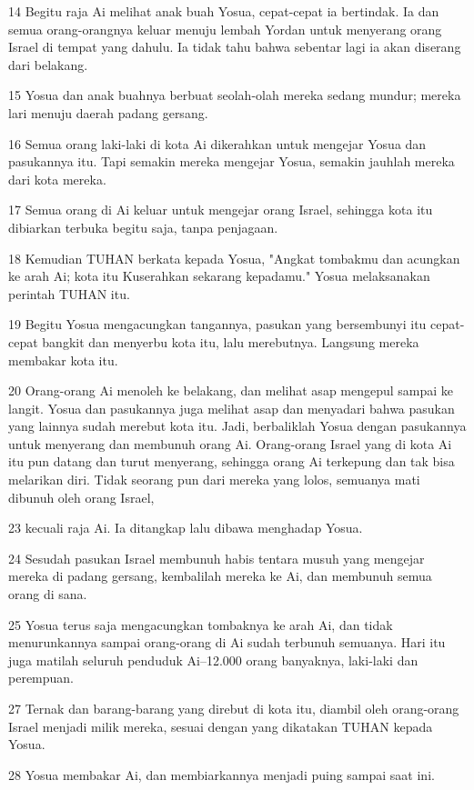 \par 14 Begitu raja Ai melihat anak buah Yosua, cepat-cepat ia bertindak. Ia dan semua orang-orangnya keluar menuju lembah Yordan untuk menyerang orang Israel di tempat yang dahulu. Ia tidak tahu bahwa sebentar lagi ia akan diserang dari belakang.
\par 15 Yosua dan anak buahnya berbuat seolah-olah mereka sedang mundur; mereka lari menuju daerah padang gersang.
\par 16 Semua orang laki-laki di kota Ai dikerahkan untuk mengejar Yosua dan pasukannya itu. Tapi semakin mereka mengejar Yosua, semakin jauhlah mereka dari kota mereka.
\par 17 Semua orang di Ai keluar untuk mengejar orang Israel, sehingga kota itu dibiarkan terbuka begitu saja, tanpa penjagaan.
\par 18 Kemudian TUHAN berkata kepada Yosua, "Angkat tombakmu dan acungkan ke arah Ai; kota itu Kuserahkan sekarang kepadamu." Yosua melaksanakan perintah TUHAN itu.
\par 19 Begitu Yosua mengacungkan tangannya, pasukan yang bersembunyi itu cepat-cepat bangkit dan menyerbu kota itu, lalu merebutnya. Langsung mereka membakar kota itu.
\par 20 Orang-orang Ai menoleh ke belakang, dan melihat asap mengepul sampai ke langit. Yosua dan pasukannya juga melihat asap dan menyadari bahwa pasukan yang lainnya sudah merebut kota itu. Jadi, berbaliklah Yosua dengan pasukannya untuk menyerang dan membunuh orang Ai. Orang-orang Israel yang di kota Ai itu pun datang dan turut menyerang, sehingga orang Ai terkepung dan tak bisa melarikan diri. Tidak seorang pun dari mereka yang lolos, semuanya mati dibunuh oleh orang Israel,
\par 23 kecuali raja Ai. Ia ditangkap lalu dibawa menghadap Yosua.
\par 24 Sesudah pasukan Israel membunuh habis tentara musuh yang mengejar mereka di padang gersang, kembalilah mereka ke Ai, dan membunuh semua orang di sana.
\par 25 Yosua terus saja mengacungkan tombaknya ke arah Ai, dan tidak menurunkannya sampai orang-orang di Ai sudah terbunuh semuanya. Hari itu juga matilah seluruh penduduk Ai--12.000 orang banyaknya, laki-laki dan perempuan.
\par 27 Ternak dan barang-barang yang direbut di kota itu, diambil oleh orang-orang Israel menjadi milik mereka, sesuai dengan yang dikatakan TUHAN kepada Yosua.
\par 28 Yosua membakar Ai, dan membiarkannya menjadi puing sampai saat ini.
